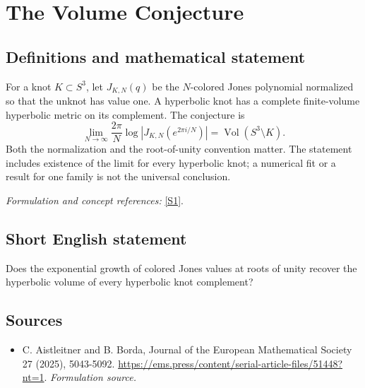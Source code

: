 \documentclass[11pt]{article}
\begin{document}
\section*{\texorpdfstring{The Volume Conjecture}{The Volume Conjecture}}\label{statement}
\subsection{Definitions and mathematical statement}
For a knot $K\subset S^3$, let $J_{K,N}(q)$ be the $N$-colored Jones polynomial normalized so that the unknot has value one. A hyperbolic knot has a complete finite-volume hyperbolic metric on its complement. The conjecture is
\[
 \lim_{N\to\infty}\frac{2\pi}{N}\log\left|J_{K,N}(e^{2\pi i/N})\right|
 =\operatorname{Vol}(S^3\setminus K).
\]
Both the normalization and the root-of-unity convention matter. The statement includes existence of the limit for every hyperbolic knot; a numerical fit or a result for one family is not the universal conclusion.
\par\smallskip\textit{Formulation and concept references:} \href{https://ems.press/content/serial-article-files/51448?nt=1}{[S1]}.

\subsection{Short English statement}
Does the exponential growth of colored Jones values at roots of unity recover the hyperbolic volume of every hyperbolic knot complement?
\subsection{Sources}
\begin{itemize}
\item[S1]C. Aistleitner and B. Borda, Journal of the European Mathematical Society 27 (2025), 5043-5092.
\url{https://ems.press/content/serial-article-files/51448?nt=1}.
\textit{Formulation source.}
\end{itemize}
\end{document}
